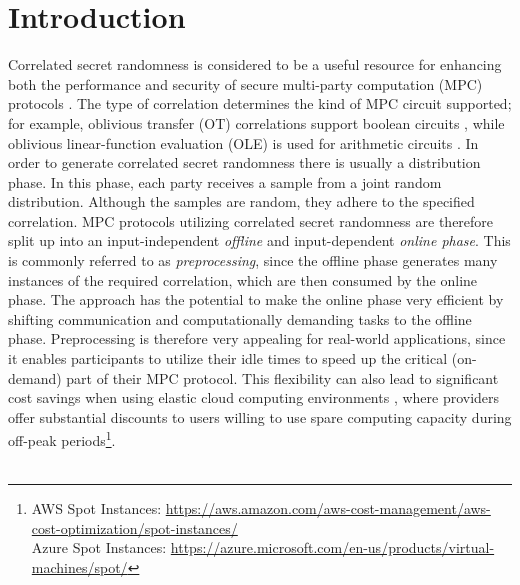 \chapter{Introduction}
Correlated secret randomness is considered to be a useful resource for enhancing both the performance and security of secure multi-party computation (MPC) protocols \cite{ishai2013power}. The type of correlation determines the kind of MPC circuit supported; for example, oblivious transfer (OT) correlations support boolean circuits \cite{goldreich2019play}, while oblivious linear-function evaluation (OLE) is used for arithmetic circuits \cite{ishai2009secure}. In order to generate correlated secret randomness there is usually a distribution phase. In this phase, each party receives a sample from a joint random distribution. Although the samples are random, they adhere to the specified correlation. MPC protocols utilizing correlated secret randomness are therefore split up into an input-independent \textit{offline} and input-dependent \textit{online phase}. This is commonly referred to as \textit{preprocessing}, since the offline phase generates many instances of the required correlation, which are then consumed by the online phase. The approach has the potential to make the online phase very efficient by shifting communication and computationally demanding tasks to the offline phase. Preprocessing is therefore very appealing for real-world applications, since it enables participants to utilize their idle times to speed up the critical (on-demand) part of their MPC protocol. This flexibility can also lead to significant cost savings when using elastic cloud computing environments \cite{coutinho2015elasticity}, where providers offer substantial discounts to users willing to use spare computing capacity during off-peak periods\footnote{AWS Spot Instances: \url{https://aws.amazon.com/aws-cost-management/aws-cost-optimization/spot-instances/} \\ Azure Spot Instances: \url{https://azure.microsoft.com/en-us/products/virtual-machines/spot/}}.
\\\\
